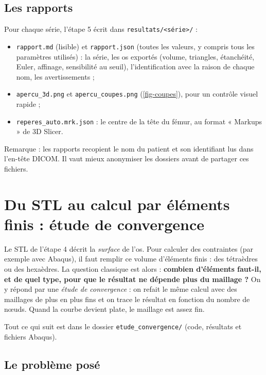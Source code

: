 \documentclass[11pt,a4paper]{article}
\newcommand{\fichier}[1]{\texttt{\small #1}}
\begin{document}
\subsection{Les rapports}

Pour chaque série, l'étape 5 écrit dans \fichier{resultats/<série>/} :
\begin{itemize}
  \item \fichier{rapport.md} (lisible) et \fichier{rapport.json} (toutes les valeurs, y compris tous les paramètres
  utilisés) : la série, les os exportés (volume, triangles, étanchéité, Euler, affinage, sensibilité au seuil),
  l'identification avec la raison de chaque nom, les avertissements ;
  \item \fichier{apercu\_3d.png} et \fichier{apercu\_coupes.png} (\cref{fig-coupes}), pour un contrôle visuel rapide ;
  \item \fichier{reperes\_auto.mrk.json} : le centre de la tête du fémur, au format « Markups » de 3D Slicer.
\end{itemize}
Remarque : les rapports recopient le nom du patient et son identifiant lus dans l'en-tête DICOM. Il vaut mieux
anonymiser les dossiers avant de partager ces fichiers.

\section{Du STL au calcul par éléments finis : étude de convergence}
\label{sec-convergence}

Le STL de l'étape 4 décrit la \emph{surface} de l'os. Pour calculer des contraintes (par exemple avec Abaqus), il faut
remplir ce volume d'éléments finis : des tétraèdres ou des hexaèdres. La question classique est alors : \textbf{combien
d'éléments faut-il, et de quel type, pour que le résultat ne dépende plus du maillage ?} On y répond par une
\emph{étude de convergence} : on refait le même calcul avec des maillages de plus en plus fins et on trace le résultat en
fonction du nombre de nœuds. Quand la courbe devient plate, le maillage est assez fin.

Tout ce qui suit est dans le dossier \fichier{etude\_convergence/} (code, résultats et fichiers Abaqus).

\subsection{Le problème posé}
\end{document}
